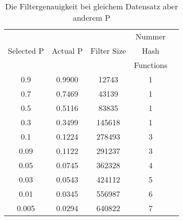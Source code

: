 \documentclass[11pt]{article}
\begin{document}
    \begin{table}[htp]
        \label{tab:summary}
        \begin{center}
            \begin{tabular}{ccccc}
                \hline
                &                 &             &Nummer     \\
                Selected P  & Actual P        & Filter Size &Hash       \\
                &                 &             &Functions	\\
                \hline

                0.9         & 0.9900          &  12743       & 1  	\\
                0.7         & 0.7469          &  43139       & 1  	\\
                0.5         & 0.5116          &  83835       & 1  	\\
                0.3         & 0.3499          &  145618      & 1  	\\
                0.1         & 0.1224          &  278493      & 3  	\\
                0.09        & 0.1122          &  291237      & 3  	\\
                0.05        & 0.0745          &  362328      & 4    \\
                0.03        & 0.0543          &  424112      & 5  	\\
                0.01        & 0.0345          &  556987      & 6  	\\
                0.005       & 0.0294          &  640822      & 7  	\\
                \hline
            \end{tabular}
        \end{center}
        \caption{Die Filtergenauigkeit bei gleichem Datensatz aber anderem P}
    \end{table}
\end{document}
